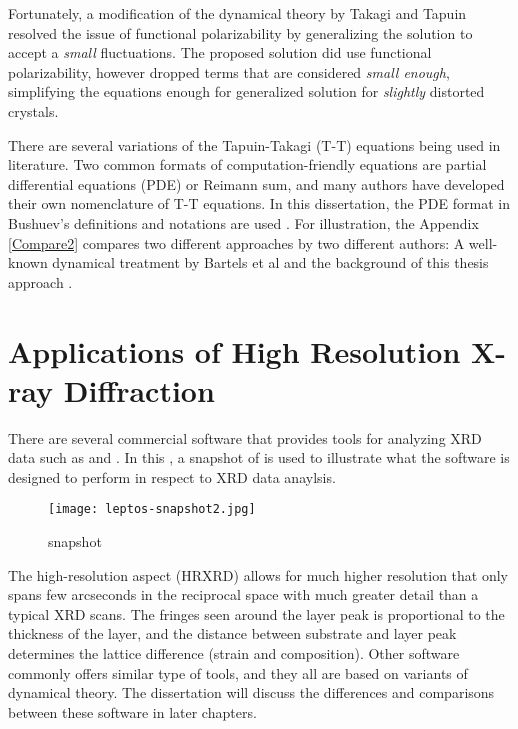 Fortunately, a modification of the dynamical theory by Takagi and Tapuin\cite{Takagi1,Takagi2,Taupin1} resolved the issue of functional polarizability by generalizing the solution to accept a \emph{small} fluctuations.  The proposed solution did use functional polarizability, however dropped terms that are considered \emph{small enough}, simplifying the equations enough for generalized solution for \emph{slightly} distorted crystals.  

There are several variations of the Tapuin-Takagi (T-T) equations being used in literature.  Two common formats of computation-friendly equations are partial differential equations (PDE) or Reimann sum, and many authors have developed their own nomenclature of T-T equations.    In this dissertation, the PDE format in Bushuev's definitions and notations are used \cite{Bushuev1,Bushuev2}.  For illustration, the Appendix \ref{Compare2} compares two different approaches by two different authors:  A well-known dynamical treatment by Bartels et al  \cite{BHL1} and the background of this thesis approach \cite{Bushuev1,Bushuev2}. 

	

	\section{Applications of High Resolution X-ray Diffraction}

There are several commercial software that provides tools for analyzing XRD data such as \LEPTOS \cite{LEPTOS}  and \RADS \cite{RADS}.  In this ,  a snapshot of \LEPTOS is used to illustrate what the software is designed to perform in respect to XRD data anaylsis.

\begin{figure}[h]
\centering
\caption{\LEPTOS snapshot}
\label{Leptos1}
\texttt{[image: leptos-snapshot2.jpg]}
\end{figure}

The high-resolution aspect (HRXRD) allows for much higher resolution that only spans few arcseconds in the reciprocal space with much greater detail than a typical XRD scans.  The fringes seen around the layer peak is proportional to the thickness of the layer, and the distance between substrate and layer peak determines the lattice difference (strain and composition).  Other software commonly offers similar type of tools, and they all are based on variants of dynamical theory.  The dissertation will discuss the differences and comparisons between these software in later chapters.


